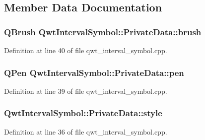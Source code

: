 \subsection{Member Data Documentation}
\hypertarget{class_qwt_interval_symbol_1_1_private_data_a58b0b79185bc8b594dc92c7db6fe9f8f}{
\subsubsection[{brush}]{\setlength{\rightskip}{0pt plus 5cm}Q\-Brush Qwt\-Interval\-Symbol\-::\-Private\-Data\-::brush}}\label{class_qwt_interval_symbol_1_1_private_data_a58b0b79185bc8b594dc92c7db6fe9f8f}


Definition at line 40 of file qwt\-\_\-interval\-\_\-symbol.\-cpp.

\hypertarget{class_qwt_interval_symbol_1_1_private_data_ab2f3c626c909f2440d791417435cac11}{
\subsubsection[{pen}]{\setlength{\rightskip}{0pt plus 5cm}Q\-Pen Qwt\-Interval\-Symbol\-::\-Private\-Data\-::pen}}\label{class_qwt_interval_symbol_1_1_private_data_ab2f3c626c909f2440d791417435cac11}


Definition at line 39 of file qwt\-\_\-interval\-\_\-symbol.\-cpp.

\hypertarget{class_qwt_interval_symbol_1_1_private_data_a58ce1a483567570ed2983e1810e75299}{
\subsubsection[{style}]{ Qwt\-Interval\-Symbol\-::\-Private\-Data\-::style}}\label{class_qwt_interval_symbol_1_1_private_data_a58ce1a483567570ed2983e1810e75299}


Definition at line 36 of file qwt\-\_\-interval\-\_\-symbol.\-cpp.

